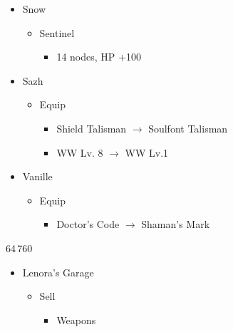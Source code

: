 \begin{multicols}{2}
\begin{menu}
\begin{itemize}
\begin{itemize}
\begin{itemize}
              \end{itemize}
        \item Snow
              \begin{itemize}
                \item Sentinel
                      \begin{itemize}
                        \item 14 nodes, HP +100
                      \end{itemize}
              \end{itemize}
      \end{itemize}
      \equip
      \begin{itemize}
        \item Sazh
              \begin{itemize}
                \item Equip
                      \begin{itemize}
                        \item Shield Talisman $\rightarrow$ Soulfont Talisman
                        \item WW Lv. 8 $\rightarrow$ WW Lv.1
                      \end{itemize}
              \end{itemize}
        \item Vanille
              \begin{itemize}
                \item Equip
                      \begin{itemize}
                        \item Doctor's Code $\rightarrow$ Shaman's Mark
                      \end{itemize}
              \end{itemize}
      \end{itemize}
    \end{itemize}
  \end{menu}
  \begin{shop}{64\,760}
    \begin{itemize}
      \item Lenora's Garage
            \begin{itemize}
              \item Sell
                    \begin{itemize}
                      \item Weapons
                            \begin{itemize}

\end{itemize}
\end{itemize}
\end{itemize}
\end{itemize}
\end{shop}
\end{multicols}
